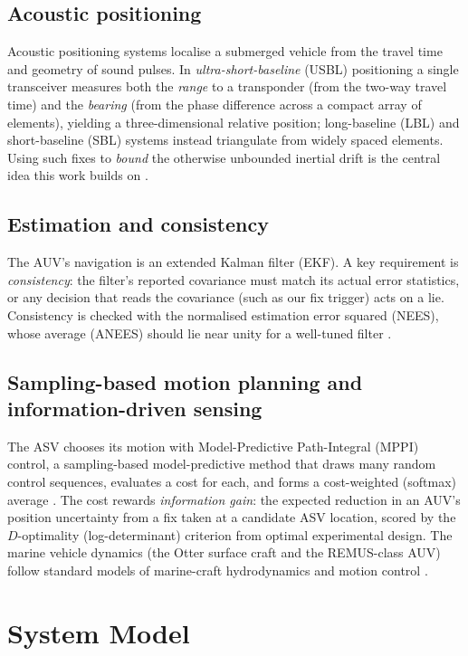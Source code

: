 \documentclass[12pt,a4paper,oneside]{book}
\begin{document}
\section{Acoustic positioning}
Acoustic positioning systems localise a submerged vehicle from the travel time and geometry of sound
pulses. In \emph{ultra-short-baseline} (USBL) positioning a single transceiver measures both the
\emph{range} to a transponder (from the two-way travel time) and the \emph{bearing} (from the phase
difference across a compact array of elements), yielding a three-dimensional relative position;
long-baseline (LBL) and short-baseline (SBL) systems instead triangulate from widely spaced elements.
Using such fixes to \emph{bound} the otherwise unbounded inertial drift is the central idea this work builds
on \cite{bindusbl}.

\section{Estimation and consistency}
The AUV's navigation is an extended Kalman filter (EKF). A key requirement is \emph{consistency}: the
filter's reported covariance must match its actual error statistics, or any decision that reads the
covariance (such as our fix trigger) acts on a lie. Consistency is checked with the normalised estimation
error squared (NEES), whose average (ANEES) should lie near unity for a well-tuned filter
\cite{barshalom2001estimation}.

\section{Sampling-based motion planning and information-driven sensing}
The ASV chooses its motion with Model-Predictive Path-Integral (MPPI) control, a sampling-based
model-predictive method that draws many random control sequences, evaluates a cost for each, and forms a
cost-weighted (softmax) average \cite{williams2017mppi}. The cost rewards \emph{information gain}: the
expected reduction in an AUV's position uncertainty from a fix taken at a candidate ASV location, scored by
the $D$-optimality (log-determinant) criterion from optimal experimental design. The marine vehicle
dynamics (the Otter surface craft and the REMUS-class AUV) follow standard models of marine-craft
hydrodynamics and motion control \cite{fossen2011handbook}.

\chapter{System Model}
\label{ch:model}
\end{document}
